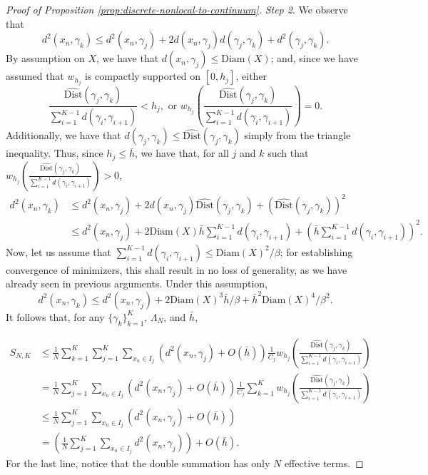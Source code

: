 \documentclass[aos, preprint]{imsart}
\theoremstyle{plain}
\theoremstyle{remark}
\begin{document}
\begin{appendix}
\begin{proof}[Proof of Proposition \ref{prop:discrete-nonlocal-to-continuum}]
\emph{Step 2}.
We observe that
\[
d^{2}(x_{n},\gamma_{k})\leq d^{2}(x_{n},\gamma_{j})+2d(x_{n},\gamma_{j})d(\gamma_{j},\gamma_{k})+d^{2}(\gamma_{j},\gamma_{k}).
\]
By assumption on $X$, we have that $d(x_{n},\gamma_{j})\leq\text{Diam}(X)$;
and, since we have assumed that  $w_{h_j}$ is compactly supported on $[0,h_j]$,
either
\[
\frac{\widehat{\text{Dist}}(\gamma_{j},\gamma_{k})}{\sum_{i=1}^{K-1}d(\gamma_{i},\gamma_{i+1})}<h_{j},\text{ or }w_{h_{j}}\left(\frac{\widehat{\text{Dist}}(\gamma_{j},\gamma_{k})}{\sum_{i=1}^{K-1}d(\gamma_{i},\gamma_{i+1})}\right)=0.
\]
Additionally, we have that $d(\gamma_{j},\gamma_{k})\leq\widehat{\text{Dist}}(\gamma_{j},\gamma_{k})$
simply from the triangle inequality. Thus, since $h_{j}\leq\bar{h}$,
we have that, for all $j$ and $k$ such that $w_{h_{j}}\left(\frac{\widehat{\text{Dist}}(\gamma_{j},\gamma_{k})}{\sum_{i=1}^{K-1}d(\gamma_{i},\gamma_{i+1})}\right)>0$,
\begin{align*}
d^{2}(x_{n},\gamma_{k}) & \leq d^{2}(x_{n},\gamma_{j})+2d(x_{n},\gamma_{j})\widehat{\text{Dist}}(\gamma_{j},\gamma_{k})+\left(\widehat{\text{Dist}}(\gamma_{j},\gamma_{k})\right)^{2}\\
 & \leq d^{2}(x_{n},\gamma_{j})+2\text{Diam}(X)\bar{h}\sum_{i=1}^{K-1}d(\gamma_{i},\gamma_{i+1})+\left(\bar{h}\sum_{i=1}^{K-1}d(\gamma_{i},\gamma_{i+1})\right)^{2}.
\end{align*}
Now, let us assume that $\sum_{i=1}^{K-1}d(\gamma_{i},\gamma_{i+1})\leq\text{Diam}(X)^{2}/\beta$;
for establishing convergence of minimizers, this shall result in no
loss of generality, as we have already seen in previous arguments.
Under this assumption,
\[
d^{2}(x_{n},\gamma_{k})\leq d^{2}(x_{n},\gamma_{j})+2\text{Diam}(X)^{3}\bar{h}/\beta+\bar{h}^{2}\text{Diam}(X)^{4}/\beta^2.
\]
It follows that, for any $\{\gamma_{k}\}_{k=1}^{K}$, $\Lambda_{N}$,
and $\bar{h}$,

\begin{align*}
 S_{N,K} & \leq\frac{1}{N}\sum_{k=1}^{K}\sum_{j=1}^{K}\sum_{x_{n}\in I_{j}}\left(d^{2}(x_{n},\gamma_{j})+ O(\bar h)
\right)\frac{1}{C_{j}}w_{h_{j}}\left(\frac{\widehat{\text{Dist}}(\gamma_{j},\gamma_{k})}{\sum_{i=1}^{K-1}d(\gamma_{i},\gamma_{i+1})}\right)\\
 & =\frac{1}{N}\sum_{j=1}^{K}\sum_{x_{n}\in I_{j}}\left(d^{2}(x_{n},\gamma_{j})+
 O(\bar h)
 \right)\frac{1}{C_{j}}\sum_{k=1}^{K}w_{h_j}\left(\frac{\widehat{\text{Dist}}(\gamma_{j},\gamma_{k})}{\sum_{i=1}^{K-1}d(\gamma_{i},\gamma_{i+1})}\right)\\
 & \leq \frac{1}{N}\sum_{j=1}^{K}\sum_{x_{n}\in I_{j}}\left(d^{2}(x_{n},\gamma_{j})
 + O(\bar h)
 \right)\\
 & =\left(\frac{1}{N}\sum_{j=1}^{K}\sum_{x_{n}\in I_{j}}d^{2}(x_{n},\gamma_{j})
 \right)+ O(\bar h).
\end{align*}
For the last line, notice that the double summation has only $N$ effective terms.


\end{proof}
\end{appendix}
\end{document}

